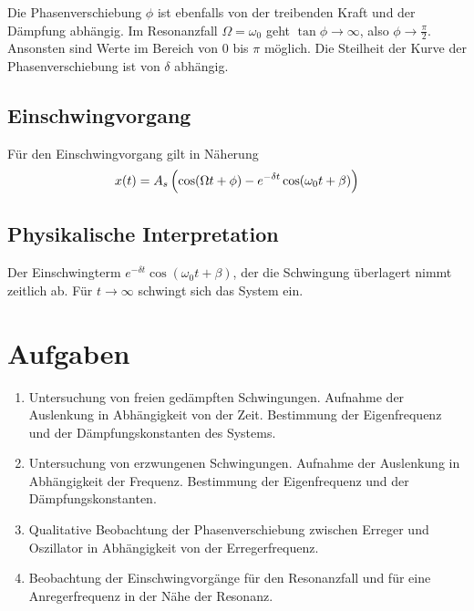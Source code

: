 \documentclass[a4paper,german,12pt,smallheadings]{scrartcl}
\begin{document}
Die Phasenverschiebung $\phi$ ist ebenfalls von der treibenden Kraft und der
Dämpfung abhängig. Im Resonanzfall $\Omega = \omega_0$ geht $\tan \phi \to
\infty$, also $\phi \to \frac{\pi}{2}$. Ansonsten sind Werte im Bereich von $0$
bis $\pi$ möglich. Die Steilheit der Kurve der Phasenverschiebung ist von
$\delta$ abhängig.

\subsection{Einschwingvorgang}
Für den Einschwingvorgang gilt in Näherung
\begin{equation}
  x(t) = A_s \del{\cos(\Omega t + \phi) - e^{-\delta t} \cos(\omega_0 t + \beta)}
  \label{eq:ein}
\end{equation}

\subsection{Physikalische Interpretation}
Der Einschwingterm $e^{-\delta t} \cos(\omega_0 t + \beta)$, der die Schwingung
überlagert nimmt zeitlich ab. Für $t \to \infty$ schwingt sich das System ein.

\section{Aufgaben}
\begin{enumerate}[1.]
  \item
    Untersuchung von freien gedämpften Schwingungen. Aufnahme der Auslenkung in
    Abhängigkeit von der Zeit. Bestimmung der Eigenfrequenz und der
    Dämpfungskonstanten des Systems.
  \item
    Untersuchung von erzwungenen Schwingungen. Aufnahme der Auslenkung in
    Abhängigkeit der Frequenz. Bestimmung der Eigenfrequenz und der
    Dämpfungskonstanten.
  \item
    Qualitative Beobachtung der Phasenverschiebung zwischen Erreger und
    Oszillator in Abhängigkeit von der Erregerfrequenz.
  \item
    Beobachtung der Einschwingvorgänge für den Resonanzfall und für eine
    Anregerfrequenz in der Nähe der Resonanz.
\end{enumerate}
\end{document}

